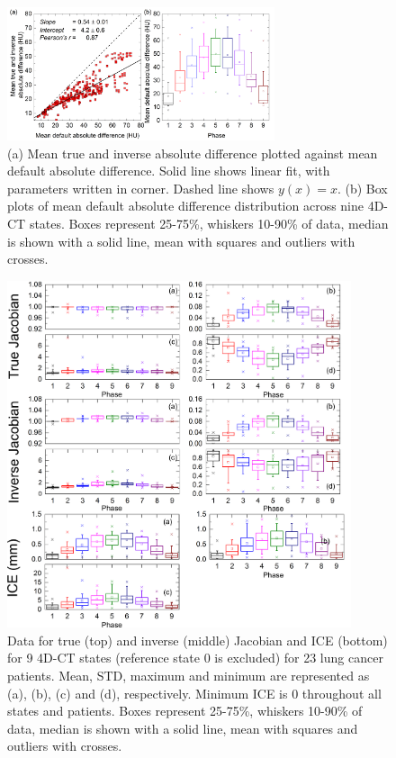 \begin{figure}[H]
	\begin{center}		
		\includegraphics[width=0.7\textwidth]{./Vmm/Images/absDiff.png}
		\caption{(a) Mean true and inverse absolute difference plotted against mean default absolute difference. Solid line shows linear fit, with parameters
		written in corner. Dashed line shows $y(x)=x$. (b) Box plots of mean default absolute difference distribution across nine 4D-CT states. Boxes represent 25-75\%, whiskers 10-90\%
		of data, median is shown with a solid line, mean with squares and outliers with crosses.}
		\label{absDiff_lung}
	\end{center}
\end{figure}

\newpage

\begin{figure}[H]
	\begin{center}		
		\includegraphics[width=0.9\textwidth]{./Vmm/Images/Jacobian_data.png}
		\caption{Data for true (top) and inverse (middle) Jacobian and ICE (bottom) for 9 4D-CT states (reference state 0 is excluded) for 23 lung cancer patients. Mean, STD, maximum and minimum are represented as (a), (b), (c) and (d), respectively.
		Minimum ICE is 0 throughout all states and patients. Boxes represent 25-75\%, whiskers 10-90\% of data, median is shown with a solid line, mean with squares and outliers with crosses.}
		\label{jacobian_data}
	\end{center}
\end{figure}

